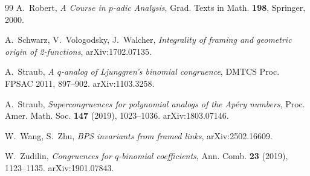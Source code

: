 \documentclass[11pt]{amsart}
\theoremstyle{definition}
\begin{document}
\begin{thebibliography}{99}
 A.~Robert, \emph{A Course in $p$-adic Analysis}, Grad. Texts in Math. \textbf{198}, Springer, 2000.

 A.~Schwarz, V.~Vologodsky, J.~Walcher, \emph{Integrality of framing and geometric origin of 2-functions}, arXiv:1702.07135.

 A.~Straub, \emph{A $q$-analog of Ljunggren's binomial congruence}, DMTCS Proc. FPSAC 2011, 897--902. arXiv:1103.3258.

 A.~Straub, \emph{Supercongruences for polynomial analogs of the Ap\'ery numbers}, Proc. Amer. Math. Soc. \textbf{147} (2019), 1023--1036. arXiv:1803.07146.

 W.~Wang, S.~Zhu, \emph{BPS invariants from framed links}, arXiv:2502.16609.

 W.~Zudilin, \emph{Congruences for $q$-binomial coefficients}, Ann. Comb. \textbf{23} (2019), 1123--1135. arXiv:1901.07843.

\end{thebibliography}
\end{document}
